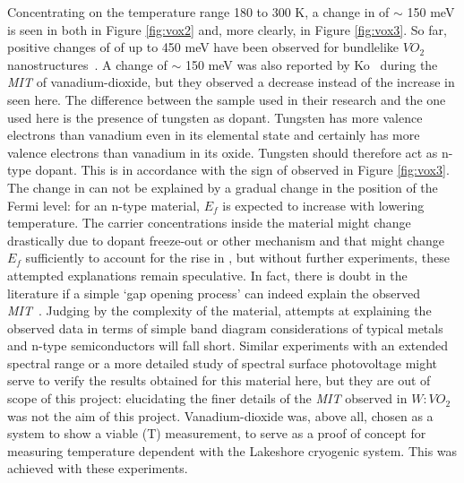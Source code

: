 Concentrating on the temperature range 180 to 300 K, a change in \wf{} of $\sim$ 150 meV is seen in both in Figure \ref{fig:vox2} and, more clearly, in Figure \ref{fig:vox3}. So far, positive changes of \wf{} of up to 450 meV have been observed for bundlelike $VO_2$ nanostructures~\cite{yin_450change}. A change of $\sim$ 150 meV was also reported by Ko~\cite{ko_kp} during the \emph{MIT} of vanadium-dioxide, but they observed a decrease instead of the increase in \wf{} seen here. The difference between the sample used in their research and the one used here is the presence of tungsten as dopant. Tungsten has more valence electrons than vanadium even in its elemental state and certainly has more valence electrons than vanadium in its oxide. Tungsten should therefore act as n-type dopant. This is in accordance with the sign of \spv{} observed in Figure \ref{fig:vox3}. The change in \wf{} can not be explained by a gradual change in the position of the Fermi level: for an n-type material, $E_f$ is expected to increase with lowering temperature. The carrier concentrations inside the material might change drastically due to dopant freeze-out or other mechanism and that might change $E_f$ sufficiently to account for the rise in \wf{}, but without further experiments, these attempted explanations remain speculative. In fact, there is doubt in the literature if a simple `gap opening process' can indeed explain the observed \emph{MIT}~\cite{eyert_theobands,booth_theobands}. Judging by the complexity of the material, attempts at explaining the observed data in terms of simple band diagram considerations of typical metals and n-type semiconductors will fall short. Similar experiments with an extended spectral range or a more detailed study of spectral surface photovoltage might serve to verify the results obtained for this material here, but they are out of scope of this project: elucidating the finer details of the \emph{MIT} observed in $W:VO_2$ was not the aim of this project. Vanadium-dioxide was, above all, chosen as a system to show a viable \spv{}(T) measurement, to serve as a proof of concept for measuring temperature dependent \spv{} with the Lakeshore cryogenic system. This was achieved with these experiments.

